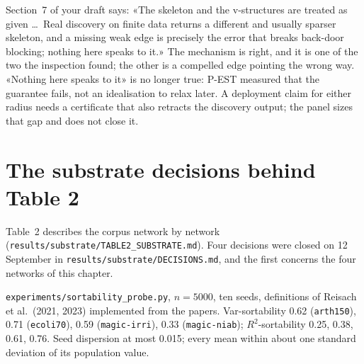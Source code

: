 \begin{armadilha}
Section~7 of your draft says: «The skeleton and the v-structures are treated as given \ldots\ Real
discovery on finite data returns a different and usually sparser skeleton, and a missing weak edge is
precisely the error that breaks back-door blocking; nothing here speaks to it.» The mechanism is right,
and it is one of the two the inspection found; the other is a compelled edge pointing the wrong way.
«Nothing here speaks to it» is no longer true: P-EST measured that the guarantee fails, not an
idealisation to relax later. A deployment claim for either radius needs a certificate that also
retracts the discovery output; the panel sizes that gap and does not close it.
\end{armadilha}


\begin{antes}
\end{antes}

\section{The substrate decisions behind Table 2}

Table~2 describes the corpus network by network (\texttt{results/substrate/TABLE2\_SUBSTRATE.md}).
Four decisions were closed on 12 September in \texttt{results/substrate/DECISIONS.md}, and the first
concerns the four networks of this chapter.

\begin{medido}
\texttt{experiments/sortability\_probe.py}, $n = 5000$, ten seeds, definitions of Reisach et al.\
(2021, 2023) implemented from the papers.
Var-sortability 0.62 (\texttt{arth150}), 0.71 (\texttt{ecoli70}), 0.59 (\texttt{magic-irri}), 0.33
(\texttt{magic-niab}); $R^2$-sortability 0.25, 0.38, 0.61, 0.76. Seed dispersion at most 0.015; every
mean within about one standard deviation of its population value.
\end{medido}


